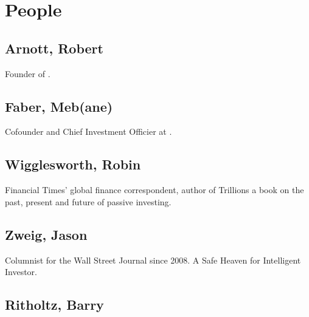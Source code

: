 \documentclass[letterpaper,10pt,english]{jupyterBook}
\begin{document}
\section{People}
\label{\detokenize{ch/people/list:people}}\label{\detokenize{ch/people/list:fin-edu-resources-people}}

\subsection{Arnott, Robert}
\label{\detokenize{ch/people/list:arnott-robert}}\label{\detokenize{ch/people/list:fin-edu-resources-people-arnott}}
\sphinxAtStartPar
Founder of {\hyperref[\detokenize{ch/people/list:fin-edu-resources-firms-research-affiliates}]{}}.


\subsection{Faber, Meb(ane)}
\label{\detokenize{ch/people/list:faber-meb-ane}}\label{\detokenize{ch/people/list:fin-edu-resources-people-faber}}
\sphinxAtStartPar
Co\sphinxhyphen{}founder and Chief Investment Officier at {\hyperref[\detokenize{ch/people/list:fin-edu-resources-firms-cambria}]{}}.


\subsection{Wigglesworth, Robin}
\label{\detokenize{ch/people/list:wigglesworth-robin}}\label{\detokenize{ch/people/list:fin-edu-resources-people-wigglesworth}}
\sphinxAtStartPar
Financial Times’ global finance correspondent, author of Trillions a book on the past, present and future of passive investing.


\subsection{Zweig, Jason}
\label{\detokenize{ch/people/list:zweig-jason}}\label{\detokenize{ch/people/list:fin-edu-resources-people-zweig}}
\sphinxAtStartPar
Columnist for the Wall Street Journal since 2008. A Safe Heaven for Intelligent Investor.


\subsection{Ritholtz, Barry}
\label{\detokenize{ch/people/list:ritholtz-barry}}\label{\detokenize{ch/people/list:fin-edu-resources-people-ritholtz}}
\end{document}
